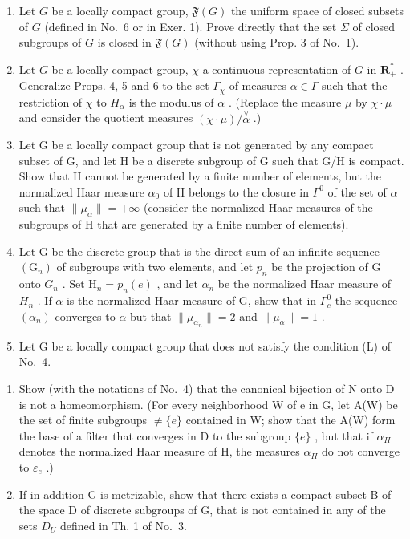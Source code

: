\begin{enumerate}
\def\labelenumi{\arabic{enumi})}
\setcounter{enumi}{1}
\item
  Let \(G\) be a locally compact group, \(\mathfrak{F}(G)\) the uniform space of closed subsets of \(G\) (defined in No.~6 or in Exer. 1). Prove directly that the set \(\Sigma\) of closed subgroups of \(G\) is closed in \(\mathfrak{F}(G)\) (without using Prop. 3 of No.~1).
\item
  Let \(G\) be a locally compact group, \(\chi\) a continuous representation of \(G\) in \(\mathbf{R}_+^*\) . Generalize Props. 4, 5 and 6 to the set \(\Gamma_{\chi}\) of measures \(\alpha \in \Gamma\) such that the restriction of \(\chi\) to \(H_{\alpha}\) is the modulus of \(\alpha\) . (Replace the measure \(\mu\) by \(\chi \cdot \mu\) and consider the quotient measures \((\chi \cdot \mu) / \overset{\vee}{\alpha}\) .)
\item
  Let G be a locally compact group that is not generated by any compact subset of G, and let H be a discrete subgroup of G such that G/H is compact. Show that H cannot be generated by a finite number of elements, but the normalized Haar measure \(\alpha_{0}\) of H belongs to the closure in \(\Gamma^{0}\) of the set of \(\alpha\) such that \(\|\mu_{\alpha}\| = +\infty\) (consider the normalized Haar measures of the subgroups of H that are generated by a finite number of elements).
\item
  Let G be the discrete group that is the direct sum of an infinite sequence \((\mathrm{G}_{n})\) of subgroups with two elements, and let \(p_{n}\) be the projection of G onto \(G_{n}\) . Set \(\mathrm{H}_{n} = \overline{p_{n}}(e)\) , and let \(\alpha_{n}\) be the normalized Haar measure of \(H_{n}\) . If \(\alpha\) is the normalized Haar measure of G, show that in \(\Gamma_{c}^{0}\) the sequence \((\alpha_{n})\) converges to \(\alpha\) but that \(\|\mu_{\alpha_{n}}\| = 2\) and \(\|\mu_{\alpha}\| = 1\) .
\item
  Let G be a locally compact group that does not satisfy the condition (L) of No.~4.
\end{enumerate}

\begin{enumerate}
\def\labelenumi{\alph{enumi})}
\item
  Show (with the notations of No.~4) that the canonical bijection of N onto D is not a homeomorphism. (For every neighborhood W of e in G, let A(W) be the set of finite subgroups \(\neq\{e\}\) contained in W; show that the A(W) form the base of a filter that converges in D to the subgroup \(\{e\}\) , but that if \(\alpha_{H}\) denotes the normalized Haar measure of H, the measures \(\alpha_{H}\) do not converge to \(\varepsilon_{e}\) .)
\item
  If in addition G is metrizable, show that there exists a compact subset B of the space D of discrete subgroups of G, that is not contained in any of the sets \(D_{U}\) defined in Th. 1 of No.~3.
\end{enumerate}


